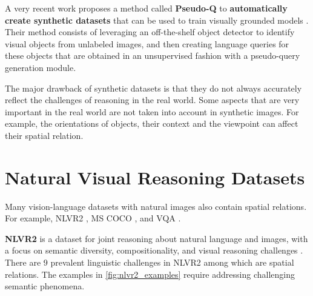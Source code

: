 A very recent work proposes a method called \textbf{Pseudo-Q} to \textbf{automatically create synthetic datasets} that can be used to train visually grounded models \cite{jiang2022pseudo}. Their method consists of leveraging an off-the-shelf object detector to identify visual objects from unlabeled images, and then creating language queries for these objects that are obtained in an unsupervised fashion with a pseudo-query generation module.

The major drawback of synthetic datasets is that they do not always accurately reflect the challenges of reasoning in the real world. Some aspects that are very important in the real world are not taken into account in synthetic images. For example, the orientations of objects, their context and the viewpoint can affect their spatial relation.

\section{Natural Visual Reasoning Datasets}

Many vision-language datasets with natural images also contain spatial relations. For example, NLVR2 \cite{suhr2018corpus}, MS COCO \cite{lin2014microsoft}, and VQA \cite{antol2015vqa}.

\textbf{NLVR2} is a dataset for joint reasoning about natural language and images, with a focus on semantic diversity, compositionality, and visual reasoning challenges \cite{suhr2018corpus}. There are 9 prevalent linguistic challenges in NLVR2 among which are spatial relations.
The examples in \cref{fig:nlvr2_examples} require addressing challenging semantic phenomena.

